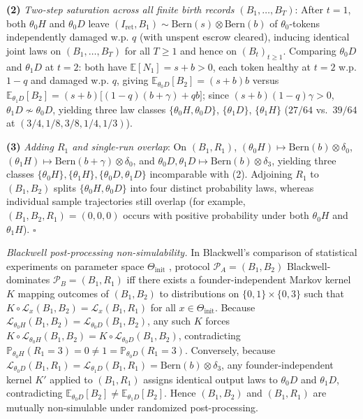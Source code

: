 \documentclass[11pt,letterpaper]{article}
\begin{document}
\textbf{(2)} \emph{Two-step saturation across all finite birth records
\((B_1,\dots,B_T)\)}: After \(t=1\), both \(\theta_0 H\) and
\(\theta_0 D\) leave
\((I_{\mathrm{ret}}, B_1) \sim \mathrm{Bern}(s) \otimes \mathrm{Bern}(b)\)
of \(\theta_0\)-tokens independently damaged w.p. \(q\) (with unspent
escrow cleared), inducing identical joint laws on \((B_1, \dots, B_T)\)
for all \(T \ge 1\) and hence on \((B_t)_{t\ge 1}\). Comparing
\(\theta_0 D\) and \(\theta_1 D\) at \(t=2\): both have
\(\mathbb{E}[N_1] = s + b > 0\), each token healthy at \(t=2\) w.p.
\(1-q\) and damaged w.p. \(q\), giving
\(\mathbb{E}_{\theta_0 D}[B_2] = (s+b)b\) versus
\(\mathbb{E}_{\theta_1 D}[B_2] = (s+b)\bigl[(1-q)(b+\gamma) + q b\bigr]\);
since \((s+b)(1-q)\gamma > 0\), \(\theta_1 D \not\sim \theta_0 D\),
yielding three law classes \(\{\theta_0 H, \theta_0 D\}\),
\(\{\theta_1 D\}\), \(\{\theta_1 H\}\) (\(27/64\) vs.~\(39/64\) at
\((3/4, 1/8, 3/8, 1/4, 1/3)\)).

\textbf{(3)} \emph{Adding \(R_1\) and single-run overlap}: On
\((B_1, R_1)\),
\((\theta_0 H) \mapsto \mathrm{Bern}(b)\otimes\delta_0\),
\((\theta_1 H) \mapsto \mathrm{Bern}(b+\gamma)\otimes\delta_0\), and
\(\theta_0 D, \theta_1 D \mapsto \mathrm{Bern}(b)\otimes\delta_3\),
yielding three classes
\(\{\theta_0 H\}, \{\theta_1 H\}, \{\theta_0 D, \theta_1 D\}\)
incomparable with (2). Adjoining \(R_1\) to \((B_1, B_2)\) splits
\(\{\theta_0 H, \theta_0 D\}\) into four distinct probability laws,
whereas individual sample trajectories still overlap (for example,
\((B_1, B_2, R_1) = (0, 0, 0)\) occurs with positive probability under
both \(\theta_0 H\) and \(\theta_1 H\)). \(\square\)

\emph{Blackwell post-processing non-simulability.} In Blackwell's
\citeyearpar{blackwell1953} comparison of statistical experiments on
parameter space \(\Theta_{\mathrm{init}}\)
\citep{barnettCrutchfield2015}, protocol \(\mathcal{P}_A = (B_1, B_2)\)
Blackwell-dominates \(\mathcal{P}_B = (B_1, R_1)\) iff there exists a
founder-independent Markov kernel \(K\) mapping outcomes of
\((B_1, B_2)\) to distributions on \(\{0,1\}\times\{0,3\}\) such that
\(K \circ \mathcal{L}_x(B_1, B_2) = \mathcal{L}_x(B_1, R_1)\) for all
\(x \in \Theta_{\mathrm{init}}\). Because
\(\mathcal{L}_{\theta_0 H}(B_1, B_2) = \mathcal{L}_{\theta_0 D}(B_1, B_2)\),
any such \(K\) forces
\(K \circ \mathcal{L}_{\theta_0 H}(B_1, B_2) = K \circ \mathcal{L}_{\theta_0 D}(B_1, B_2)\),
contradicting
\(\mathbb{P}_{\theta_0 H}(R_1 = 3) = 0 \neq 1 = \mathbb{P}_{\theta_0 D}(R_1 = 3)\).
Conversely, because
\(\mathcal{L}_{\theta_0 D}(B_1, R_1) = \mathcal{L}_{\theta_1 D}(B_1, R_1) = \mathrm{Bern}(b)\otimes\delta_3\),
any founder-independent kernel \(K'\) applied to \((B_1, R_1)\) assigns
identical output laws to \(\theta_0 D\) and \(\theta_1 D\),
contradicting
\(\mathbb{E}_{\theta_0 D}[B_2] \neq \mathbb{E}_{\theta_1 D}[B_2]\).
Hence \((B_1, B_2)\) and \((B_1, R_1)\) are mutually non-simulable under
randomized post-processing.
\end{document}
